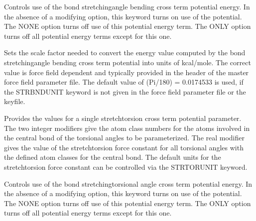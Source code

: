 \documentclass[letterpaper,11pt,english]{sphinxmanual}
\begin{document}
\ignorespaces {}\label{\detokenize{text/keywords:key-strbndterm}}\begin{description}
\sphinxAtStartPar
Controls use of the bond stretching\sphinxhyphen{}angle bending cross term potential energy. In the absence of a modifying option, this keyword turns on use of the potential. The NONE option turns off use of this potential energy term. The ONLY option turns off all potential energy terms except for this one.

\end{description}

\ignorespaces {}\label{\detokenize{text/keywords:key-strbndunit}}\begin{description}
\sphinxAtStartPar
Sets the scale factor needed to convert the energy value computed by the bond stretching\sphinxhyphen{}angle bending cross term potential into units of kcal/mole. The correct value is force field dependent and typically provided in the header of the master force field parameter file. The default value of (Pi/180) = 0.0174533 is used, if the STRBNDUNIT keyword is not given in the force field parameter file or the keyfile.

\end{description}

\ignorespaces {}\label{\detokenize{text/keywords:key-strtors}}\begin{description}
\sphinxAtStartPar
Provides the values for a single stretch\sphinxhyphen{}torsion cross term potential parameter. The two integer modifiers give the atom class numbers for the atoms involved in the central bond of the torsional angles to be parameterized. The real modifier gives the value of the stretch\sphinxhyphen{}torsion force constant for all torsional angles with the defined atom classes for the central bond. The default units for the stretch\sphinxhyphen{}torsion force constant can be controlled via the STRTORUNIT keyword.

\end{description}

\ignorespaces {}\label{\detokenize{text/keywords:key-strtorterm}}\begin{description}
\sphinxAtStartPar
Controls use of the bond stretching\sphinxhyphen{}torsional angle cross term potential energy. In the absence of a modifying option, this keyword turns on use of the potential. The NONE option turns off use of this potential energy term. The ONLY option turns off all potential energy terms except for this one.

\end{description}
\end{document}
